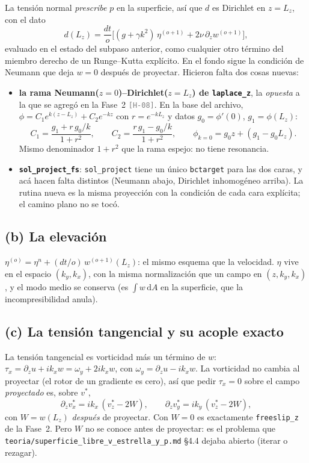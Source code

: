 \documentclass[11pt,a4paper]{article}
\newcommand{\dd}{\mathrm{d}}
\newcommand{\etq}[1]{\textcolor{gray}{\texttt{[#1]}}}
\newcommand{\archivo}[1]{\nolinkurl{#1}}
\begin{document}
La tensión normal \emph{prescribe} $p$ en la superficie, así que $d$ es Dirichlet en
$z=L_z$, con el dato
\begin{equation}
d(L_z)=\frac{dt}{o}\Big[(g+\gamma k^2)\,\eta^{(o+1)}+2\nu\,\partial_zw^{(o+1)}\Big],
\label{eq:dirichlet}
\end{equation}
evaluado en el estado del subpaso anterior, como cualquier otro término del miembro
derecho de un Runge--Kutta explícito. En el fondo sigue la condición de Neumann que deja
$w=0$ después de proyectar. Hicieron falta dos cosas nuevas:
\begin{itemize}
\item \textbf{la rama Neumann($z=0$)--Dirichlet($z=L_z$) de \texttt{laplace\_z}}, la
  \emph{opuesta} a la que se agregó en la Fase~2 \etq{H-08}. En la base del archivo,
  $\phi=C_1e^{k(z-L_z)}+C_2e^{-kz}$ con $r=e^{-kL_z}$ y datos $g_0=\phi'(0)$,
  $g_1=\phi(L_z)$:
  \[
  C_1=\frac{g_1+r\,g_0/k}{1+r^2},\qquad C_2=\frac{r\,g_1-g_0/k}{1+r^2},\qquad
  \phi_{k=0}=g_0z+(g_1-g_0L_z).
  \]
  Mismo denominador $1+r^2$ que la rama espejo: no tiene resonancia.
\item \textbf{\texttt{sol\_project\_fs}}: \texttt{sol\_project} tiene un único
  \texttt{bctarget} para las dos caras, y acá hacen falta distintos (Neumann abajo,
  Dirichlet inhomogéneo arriba). La rutina nueva es la misma proyección con la condición
  de cada cara explícita; el camino plano no se tocó.
\end{itemize}

\subsection{(b) La elevación}

$\eta^{(o)}=\eta^n+(dt/o)\,w^{(o+1)}(L_z)$: el mismo esquema que la velocidad. $\eta$ vive
en el espacio $(k_y,k_x)$, con la misma normalización que un campo en $(z,k_y,k_x)$, y el
modo medio se conserva (es $\int w\,\dd A$ en la superficie, que la incompresibilidad
anula).

\subsection{(c) La tensión tangencial y su acople exacto}

La tensión tangencial es vorticidad más un término de $w$:
$\tau_x=\partial_zu+ik_xw=\omega_y+2ik_xw$, con $\omega_y=\partial_zu-ik_xw$. La
vorticidad no cambia al proyectar (el rotor de un gradiente es cero), así que pedir
$\tau_x=0$ sobre el campo \emph{proyectado} es, sobre $v^*$,
\begin{equation}
\partial_zv^*_x=ik_x\,(v^*_z-2W),\qquad \partial_zv^*_y=ik_y\,(v^*_z-2W),
\label{eq:tension}
\end{equation}
con $W=w(L_z)$ \emph{después} de proyectar. Con $W=0$ es exactamente \texttt{freeslip\_z}
de la Fase~2. Pero $W$ no se conoce antes de proyectar: es el problema que
\archivo{teoria/superficie_libre_v_estrella_y_p.md} §4.4 dejaba abierto (iterar o
rezagar).
\end{document}
